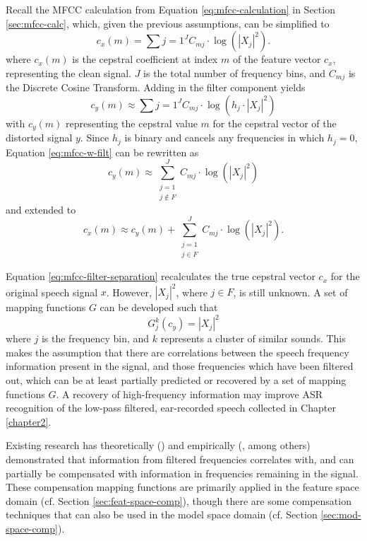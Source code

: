 Recall the MFCC calculation from Equation \ref{eq:mfcc-calculation} in Section \ref{sec:mfcc-calc}, which, given the previous assumptions, can be simplified to \begin{equation} c_x(m) = \sum{j=1}^{J} C_{mj} \cdot \log(|X_{j}|^2). \end{equation} where $c_x(m)$ is the cepstral coefficient at index $m$ of the feature vector $c_x$, representing the clean signal. $J$ is the total number of frequency bins, and $C_{mj}$ is the Discrete Cosine Transform.  Adding in the filter component yields \begin{equation}\label{eq:mfcc-w-filt} c_y(m) \approx \sum{j=1}^{J} C_{mj} \cdot \log(h_j \cdot |X_{j}|^2) \end{equation} with $c_y(m)$ representing the cepstral value $m$ for the cepstral vector of the distorted signal $y$.  Since $h_j$ is binary and cancels any frequencies in which $h_j=0$, Equation \ref{eq:mfcc-w-filt} can be rewritten as \begin{equation} c_y(m) \approx \sum_{\substack{j=1\\j\notin F}}^J C_{mj} \cdot \log(|X_j|^2) \end{equation} and extended to \begin{equation}\label{eq:mfcc-filter-separation} c_x(m) \approx c_y(m) + \sum_{\substack{j=1\\j\in F}}^J C_{mj} \cdot \log(|X_j|^2). \end{equation}
  
Equation \ref{eq:mfcc-filter-separation} recalculates the true cepstral vector $c_x$ for the original speech signal $x$.  However, $|X_j|^2$, where $j\in F$, is still unknown.  A set of mapping functions $G$ can be developed such that \begin{equation} G_j^k(c_{y}) = |X_j|^2 \end{equation} where $j$ is the frequency bin, and $k$ represents a cluster of similar sounds.  This makes the assumption that there are correlations between the speech frequency information present in the signal, and those frequencies which have been filtered out, which can be at least partially predicted or recovered by a set of mapping functions $G$. A recovery of high-frequency information may improve ASR recognition of the low-pass filtered, ear-recorded speech collected in Chapter \ref{chapter2}.

Existing research has theoretically (\cite{morales:09}) and empirically (\cite{morales:05,morales:09,he:11}, among others) demonstrated that information from filtered frequencies correlates with, and can partially be compensated with information in frequencies remaining in the signal.  These compensation mapping functions are primarily applied in the feature space domain (cf. Section \ref{sec:feat-space-comp}), though there are some compensation techniques that can also be used in the model space domain (cf. Section \ref{sec:mod-space-comp}).

